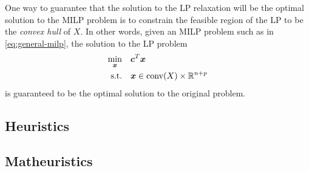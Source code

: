 One way to guarantee that the solution to the LP relaxation will be the optimal solution to the MILP problem is to constrain the feasible region of the LP to be the \emph{convex hull} of $X$.
In other words, given an MILP problem such as in \eqref{eq:general-milp}, the solution to the LP problem
\begin{align*}
    \min_{\bm{x}} \quad & \bm{c}^{T}\bm{x} \\
    \textrm{s.t.} \quad & \bm{x}\in \mathrm{conv}(X) \times  \mathbb{R}^{n+p}
\end{align*}
is guaranteed to be the optimal solution to the original problem.



\subsection{Heuristics}

\subsection{Matheuristics}

